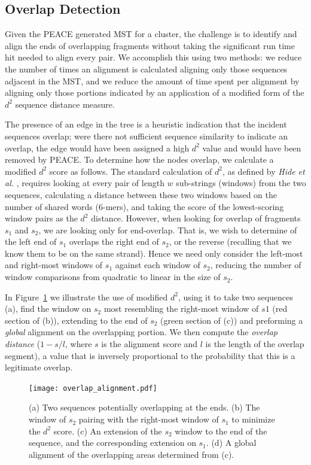 \documentclass[10pt]{bmc_article}
\newcommand{\peace} {{\small PEACE}}
\newenvironment{bmcformat}{\begin{raggedright}\baselineskip20pt\sloppy\setboolean{publ}{false}}{\end{raggedright}\baselineskip20pt\sloppy}
\begin{document}
\begin{bmcformat}
\subsection*{Overlap Detection}

Given the \peace\/ generated MST for a cluster, the challenge is to
identify and align the ends of overlapping fragments without taking
the significant run time hit needed to align every pair.  We
accomplish this using two methods: we reduce the number of times an
alignment is calculated aligning only those sequences adjacent in the
MST, and we reduce the amount of  time spent per alignment by aligning
only those portions indicated by an application of a modified form of
the $d^2$ sequence distance measure.

The presence of an edge in the tree is a heuristic indication that the
incident sequences overlap; were there not sufficient sequence
similarity to indicate an overlap, the edge would have been assigned a
high $d^2$ value and would have been removed by \peace\/.  To
determine how the nodes overlap, we calculate a modified $d^2$ score
as follows.  The standard calculation of $d^2$, as defined by {\it Hide
  et al.} \cite{Hide94}, requires looking at every pair of length $w$
sub-strings (windows) from the two sequences, calculating a distance
between these two windows based on the number of shared words
(6-mers), and taking the score of the lowest-scoring window pairs as
the $d^2$ distance.  However, when looking for overlap of fragments
$s_1$ and $s_2$, we are looking only for end-overlap.  That is, we
wish to determine of the left end of $s_1$ overlaps the right end of
$s_2$, or the reverse (recalling that we know them to be on the same
strand).  Hence we need only consider the left-most and right-most
windows of $s_1$ against each window of $s_2$, reducing the number of
window comparisons from quadratic to linear in the size of $s_2$.

In Figure~\ref{fig:overlap} we illustrate the use of modified $d^2$,
using it to take two sequences (a), find the window on $s_2$ most
resembling the right-most window of $s1$ (red section of (b)),
extending to the end of $s_2$ (green section of (c)) and preforming a
{\it global} alignment on the overlapping portion.  We then compute the
{\it overlap distance} ($1 - s/l$, where $s$ is the alignment score and
$l$ is the length of the overlap segment), a value that is inversely
proportional to the probability that this is a legitimate overlap.

\begin{figure}
\centerline{\texttt{[image: overlap\_alignment.pdf]}}
\caption{(a) Two sequences potentially overlapping at the ends.  (b)
  The window of $s_2$ pairing with the right-most window of $s_1$ to
  minimize the $d^2$ score.  (c) An extension of the $s_2$ window to
  the end of the sequence, and the corresponding extension on $s_1$.
  (d) A global alignment of the overlapping areas determined from
  (c).}\label{fig:overlap}
\end{figure}



\end{bmcformat}
\end{document}
